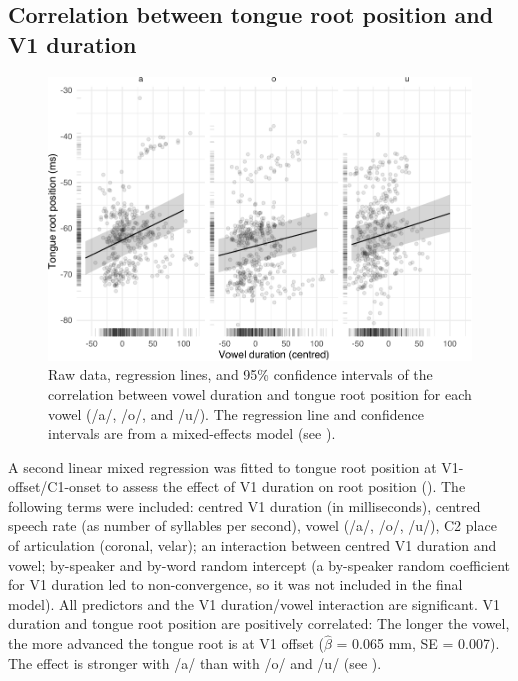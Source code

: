 \documentclass[preprint]{JASAnew}
\begin{document}
\hypertarget{correlation-between-tongue-root-position-and-v1-duration}{%
\subsection{Correlation between tongue root position and V1
duration}\label{correlation-between-tongue-root-position-and-v1-duration}}

\label{s:trp-vdur}

\begin{figure}
\includegraphics[width=\linewidth]{./Figure4-1} \caption{Raw data, regression lines, and 95\% confidence intervals of the correlation between vowel duration and tongue root position for each vowel (/a/, /o/, and /u/). The regression line and confidence intervals are from a mixed-effects model (see ).}\label{f:Figure4}
\end{figure}

A second linear mixed regression was fitted to tongue root position at
V1-offset/C1-onset to assess the effect of V1 duration on root position
(). The following terms were included: centred
V1 duration (in milliseconds), centred speech rate (as number of
syllables per second), vowel (/a/, /o/, /u/), C2 place of articulation
(coronal, velar); an interaction between centred V1 duration and vowel;
by-speaker and by-word random intercept (a by-speaker random coefficient
for V1 duration led to non-convergence, so it was not included in the
final model). All predictors and the V1 duration/vowel interaction are
significant. V1 duration and tongue root position are positively
correlated: The longer the vowel, the more advanced the tongue root is
at V1 offset (\(\hat{\beta}\) = 0.065 mm, SE = 0.007). The effect is
stronger with /a/ than with /o/ and /u/ (see ).
\end{document}
